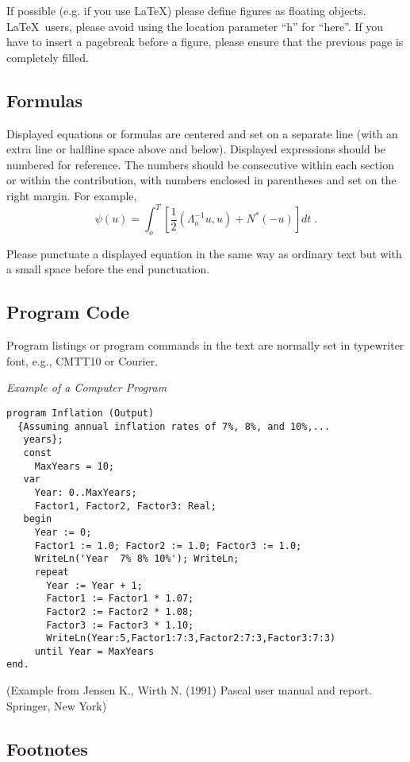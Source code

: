 \documentclass[runningheads]{llncs}
\begin{document}
If possible (e.g. if you use \LaTeX) please define figures as floating
objects. \LaTeX\ users, please avoid using the location
parameter ``h'' for ``here''. If you have to insert a pagebreak before a
figure, please ensure that the previous page is completely filled.


\subsection{Formulas}

Displayed equations or formulas are centered and set on a separate
line (with an extra line or halfline space above and below). Displayed
expressions should be numbered for reference. The numbers should be
consecutive within each section or within the contribution,
with numbers enclosed in parentheses and set on the right margin.
For example,
\begin{equation}
  \psi (u) = \int_{o}^{T} \left[\frac{1}{2}
  \left(\Lambda_{o}^{-1} u,u\right) + N^{\ast} (-u)\right] dt \;  .
\end{equation}

Please punctuate a displayed equation in the same way as ordinary
text but with a small space before the end punctuation.

\subsection{Program Code}

Program listings or program commands in the text are normally set in
typewriter font, e.g., CMTT10 or Courier.

\medskip

\noindent
{\it Example of a Computer Program}
\begin{verbatim}
program Inflation (Output)
  {Assuming annual inflation rates of 7%, 8%, and 10%,...
   years};
   const
     MaxYears = 10;
   var
     Year: 0..MaxYears;
     Factor1, Factor2, Factor3: Real;
   begin
     Year := 0;
     Factor1 := 1.0; Factor2 := 1.0; Factor3 := 1.0;
     WriteLn('Year  7% 8% 10%'); WriteLn;
     repeat
       Year := Year + 1;
       Factor1 := Factor1 * 1.07;
       Factor2 := Factor2 * 1.08;
       Factor3 := Factor3 * 1.10;
       WriteLn(Year:5,Factor1:7:3,Factor2:7:3,Factor3:7:3)
     until Year = MaxYears
end.
\end{verbatim}
%
\noindent
{\small (Example from Jensen K., Wirth N. (1991) Pascal user manual and
report. Springer, New York)}


\subsection{Footnotes}
\end{document}
